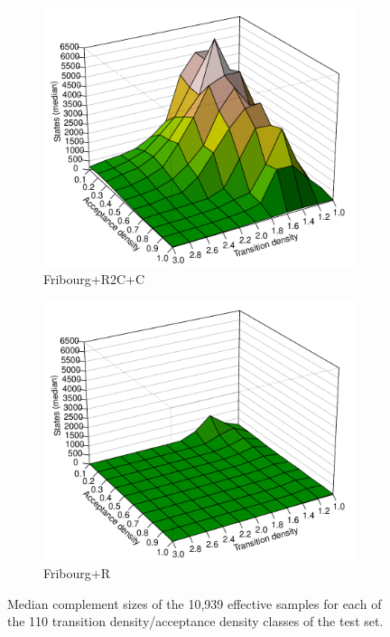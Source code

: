 \begin{figure}[ht]
  \hfill
  \begin{subfigure}[t]{\perspwidth\textwidth}
  \centering
  \includegraphics[width=\textwidth]{figures/r/internal/goal/s.median.Fribourg+R2C+C.pdf}
  \caption{Fribourg+R2C+C}
  \end{subfigure}
  \hfill
  \begin{subfigure}[t]{\perspwidth\textwidth}
  \centering
  \includegraphics[width=\textwidth]{figures/r/internal/goal/s.median.Fribourg+R.pdf}
  \caption{Fribourg+R}
  \end{subfigure}
  \hfill  
\caption{Median complement sizes of the 10,939 effective samples for each of the 110 transition density/acceptance density classes of the \goal{} test set.}
\label{i.g.persp_1}
\end{figure}

